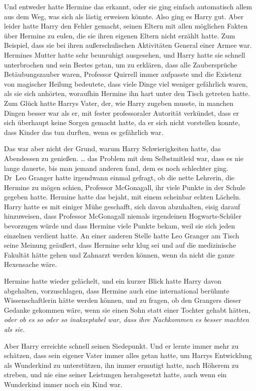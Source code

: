 {Und entweder hatte Hermine das erkannt, oder sie ging einfach automatisch allem aus dem Weg, was sich als lästig erweisen könnte. Also ging es Harry gut. Aber leider hatte Harry den Fehler gemacht, seinen Eltern mit allen möglichen Fakten über Hermine zu eulen, die sie ihren eigenen Eltern nicht erzählt hatte. Zum Beispiel, dass sie bei ihren außerschulischen Aktivitäten General einer Armee war. Hermines Mutter hatte sehr beunruhigt ausgesehen, und Harry hatte sie schnell unterbrochen und sein Bestes getan, um zu erklären, dass alle Zaubersprüche Betäubungszauber waren, Professor Quirrell immer aufpasste und die Existenz von magischer Heilung bedeutete, dass viele Dinge viel weniger gefährlich waren, als sie sich anhörten, woraufhin Hermine ihn hart unter den Tisch getreten hatte. Zum Glück hatte Harrys Vater, der, wie Harry zugeben musste, in manchen Dingen besser war als er, mit fester professoraler Autorität verkündet, dass er sich überhaupt keine Sorgen gemacht hatte, da er sich nicht vorstellen konnte, dass Kinder das tun durften, wenn es gefährlich war.

Das war aber nicht der Grund, warum Harry Schwierigkeiten hatte, das Abendessen zu genießen. … das Problem mit dem Selbstmitleid war, dass es nie lange dauerte, bis man jemand anderen fand, dem es noch schlechter ging. Dr~Leo Granger hatte irgendwann einmal gefragt, ob die nette Lehrerin, die Hermine zu mögen schien, Professor McGonagall, ihr viele Punkte in der Schule gegeben hatte. Hermine hatte das bejaht, mit einem scheinbar echten Lächeln. Harry hatte es mit einiger Mühe geschafft, sich davon abzuhalten, eisig darauf hinzuweisen, dass Professor McGonagall niemals irgendeinen Hogwarts-Schüler bevorzugen würde und dass Hermine viele Punkte bekam, weil sie sich jeden einzelnen verdient hatte. An einer anderen Stelle hatte Leo Granger am Tisch seine Meinung geäußert, dass Hermine sehr klug sei und auf die medizinische Fakultät hätte gehen und Zahnarzt werden können, wenn da nicht die ganze Hexensache wäre.

Hermine hatte wieder gelächelt, und ein kurzer Blick hatte Harry davon abgehalten, vorzuschlagen, dass Hermine auch eine international berühmte Wissenschaftlerin hätte werden können, und zu fragen, ob den Grangers dieser Gedanke gekommen wäre, wenn sie einen Sohn statt einer Tochter gehabt hätten, \emph{oder ob es so oder so inakzeptabel war, dass ihre Nachkommen es besser machten als sie.}

Aber Harry erreichte schnell seinen Siedepunkt. Und er lernte immer mehr zu schätzen, dass sein eigener Vater immer alles getan hatte, um Harrys Entwicklung als Wunderkind zu unterstützen, ihn immer ermutigt hatte, nach Höherem zu streben, und nie eine seiner Leistungen herabgesetzt hatte, auch wenn ein Wunderkind immer noch ein Kind war.

}

